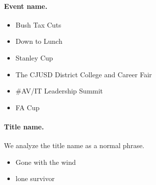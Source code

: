 \documentclass[11pt,a4paper]{article}
\begin{document}
\paragraph{Event name.}
\begin{itemize}
	\item Bush Tax Cuts
	\item Down to Lunch
	\item Stanley Cup
	\item The CJUSD District College and Career Fair
	\item \#AV/IT Leadership Summit
	\item FA Cup
\end{itemize}

\paragraph{Title name.}
We analyze the title name as a normal phrase.
\begin{itemize}
	\item Gone with the wind
	\item lone survivor
\end{itemize}

%
\end{document}
